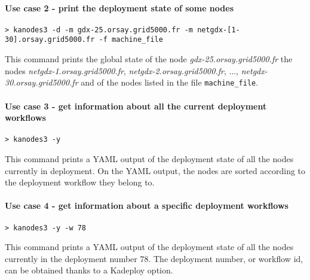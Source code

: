 \documentclass[a4wide,10pt,oneside]{book}
\begin{document}
\paragraph{Use case 2 - print the deployment state of some nodes}
\begin{verbatim}
> kanodes3 -d -m gdx-25.orsay.grid5000.fr -m netgdx-[1-30].orsay.grid5000.fr -f machine_file
\end{verbatim}
This command prints the global state of the node \textit{gdx-25.orsay.grid5000.fr} the nodes \textit{netgdx-1.orsay.grid5000.fr}, \textit{netgdx-2.orsay.grid5000.fr}, ..., \textit{netgdx-30.orsay.grid5000.fr} and of the nodes listed in the file \texttt{machine\_file}.

\paragraph{Use case 3 - get information about all the current deployment workflows}
\begin{verbatim}
> kanodes3 -y
\end{verbatim}
This command prints a YAML output of the deployment state of all the nodes currently in deployment. On the YAML output, the nodes are sorted according to the deployment workflow they belong to.

\paragraph{Use case 4 - get information about a specific deployment workflows}
\begin{verbatim}
> kanodes3 -y -w 78
\end{verbatim}
This command prints a YAML output of the deployment state of all the nodes currently in the deployment number 78. The deployment number, or workflow id, can be obtained thanks to a Kadeploy option.
\end{document}

